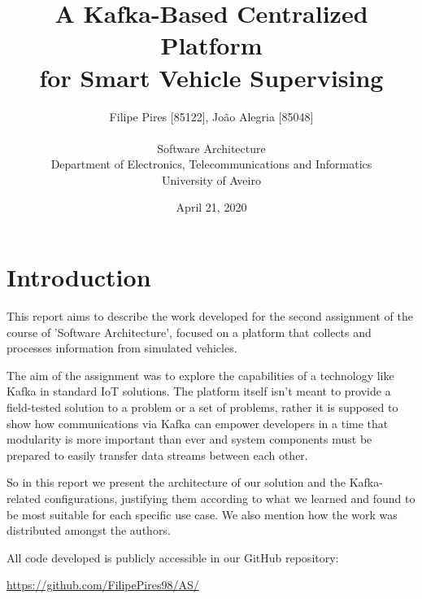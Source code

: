 \documentclass[12pt]{article}
\title{A Kafka-Based Centralized Platform\\for Smart Vehicle Supervising}
\author
{Filipe Pires [85122], João Alegria [85048]\\
\\
Software Architecture\\
\normalsize{Department of Electronics, Telecommunications and Informatics}\\
\normalsize{University of Aveiro}\\
}
\date{April 21, 2020} %
\begin{document}
 

\baselineskip18pt

\maketitle 

\section*{Introduction} %

This report aims to describe the work developed for the second assignment of the course of 'Software Architecture', focused on a platform that collects and 
processes information from simulated vehicles.

The aim of the assignment was to explore the capabilities of a technology like Kafka in standard IoT solutions.
The platform itself isn't meant to provide a field-tested solution to a problem or a set of problems, rather it is supposed to show how communications via Kafka 
can empower developers in a time that modularity is more important than ever and system components must be prepared to easily transfer data streams between each other.

So in this report we present the architecture of our solution and the Kafka-related configurations, justifying them according to what we learned and found to be 
most suitable for each specific use case.
We also mention how the work was distributed amongst the authors.

All code developed is publicly accessible in our GitHub repository:

\url{https://github.com/FilipePires98/AS/}

\end{document}
